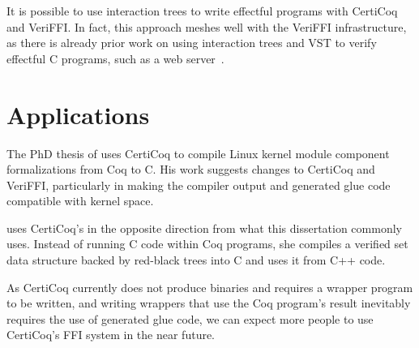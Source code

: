 \newpage
It is possible to use interaction trees to write effectful programs with CertiCoq and VeriFFI. In fact, this approach meshes well with the VeriFFI infrastructure, as there is already prior work on using interaction trees and VST to verify effectful C programs, such as a web server~\cite{koh2019itrees}.


\section{Applications}

The PhD thesis of  uses CertiCoq to compile Linux kernel module component formalizations from Coq to C. His work suggests changes to CertiCoq and VeriFFI, particularly in making the compiler output and generated glue code compatible with kernel space.

 uses CertiCoq's \FFI{} in the opposite direction from what this dissertation commonly uses. Instead of running C code within Coq programs, she compiles a verified set data structure backed by red-black trees into C and uses it from C++ code.

As CertiCoq currently does not produce binaries and requires a wrapper program to be written, and writing wrappers that use the Coq program's result inevitably requires the use of generated glue code, we can expect more people to use CertiCoq's FFI system in the near future.